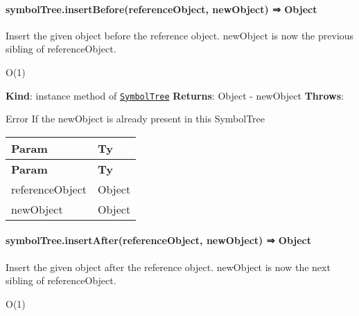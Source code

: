\label{_module_symbol-tree--SymbolTree+insertBefore}%


\paragraph*{symbol\+Tree.\+insert\+Before(reference\+Object, new\+Object) ⇒ {\ttfamily Object}}

Insert the given object before the reference object. {\ttfamily new\+Object} is now the previous sibling of {\ttfamily reference\+Object}.


\begin{DoxyItemize}
\item {\ttfamily O(1)}
\end{DoxyItemize}

{\bfseries Kind}\+: instance method of {\ttfamily \href{#exp_module_symbol-tree--SymbolTree}{\tt Symbol\+Tree}} {\bfseries Returns}\+: {\ttfamily Object} -\/ new\+Object {\bfseries Throws}\+:


\begin{DoxyItemize}
\item {\ttfamily Error} If the new\+Object is already present in this Symbol\+Tree
\end{DoxyItemize}

\tabulinesep=1mm
\begin{longtabu} spread 0pt [c]{*{2}{|X[-1]}|}
\hline
\rowcolor{\tableheadbgcolor}\textbf{ Param  }&\textbf{ Ty   }\\
\endfirsthead
\hline
\endfoot
\hline
\rowcolor{\tableheadbgcolor}\textbf{ Param  }&\textbf{ Ty   }\\
\endhead
reference\+Object  &{\ttfamily Object}   \\
new\+Object  &{\ttfamily Object}   \\
\end{longtabu}


\label{_module_symbol-tree--SymbolTree+insertAfter}%


\paragraph*{symbol\+Tree.\+insert\+After(reference\+Object, new\+Object) ⇒ {\ttfamily Object}}

Insert the given object after the reference object. {\ttfamily new\+Object} is now the next sibling of {\ttfamily reference\+Object}.


\begin{DoxyItemize}
\item {\ttfamily O(1)}
\end{DoxyItemize}

